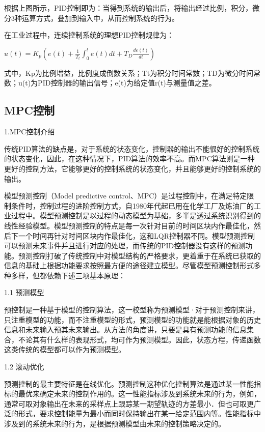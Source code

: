 根据上图所示，PID控制即为：当得到系统的输出后，将输出经过比例，积分，微分3种运算方式，叠加到输入中，从而控制系统的行为。

在工业过程中，连续控制系统的理想PID控制规律为：

$u(t)=K_{p}\left(e(t)+\frac{1}{T_{t}} \int_{0}^{t} e(t) d t+T_{D} \frac{d e(t)}{d t}\right)$

式中，Kp为比例增益，比例度成倒数关系；Tt为积分时间常数；TD为微分时间常数；u(t)为PID控制器的输出信号；e(t)为给定值r(t)与测量值之差。

\subsection{MPC控制}

1.MPC控制介绍

传统PID算法的缺点是，对于系统的状态变化，控制器的输出不能很好的控制系统的状态变化，因此，在这种情况下，PID算法的效率不高。而MPC算法则是一种更好的控制方法，它能够更好的控制系统的状态变化，并且能够更好的控制系统的输出。

模型预测控制（Model predictive control、MPC）是过程控制中，在满足特定限制条件时，控制过程的进阶控制方式，自1980年代起已用在化学工厂及炼油厂的工业过程中。模型预测控制是以过程的动态模型为基础，多半是透过系统识别得到的线性经验模型。模型预测控制的特点是每一次针对目前的时间区块内作最佳化，然后下一个时间再针对时间区块内作最佳化，这和LQR控制器不同。模型预测控制可以预测未来事件并且进行对应的处理，而传统的PID控制器没有这样的预测功能。预测控制打破了传统控制中对模型结构的严格要求，更着重于在系统已获取的信息的基础上根据功能要求按照最方便的途径建立模型。尽管模型预测控制形式多种多样，但都依赖下述三项基本原理：

1.1 预测模型

预控制是一种基于模型的控制算法，这一校型称为预测模型·对于预测控制来讲，只注重模型的功能，而不注重模型的形式，预测模型的功能就是能根据对象的历史信息和未来输入预其未来输出。从方法的角度讲，只要是具有预测功能的信息集合，不论其有什么样的表现形式，均可作为预测模型。因此，状态方程，传递函数这类传统的模型都可以作为预测模型。

1.2 滚动优化

预测控制的最主要特征是在线优化。预测控制这种优化控制算法是通过某一性能指标的最优来确定未来的控制作用的。这一性能指标涉及到系统未来的行为，例如，通常可取对象输出在未来的采样点上跟踪某一期望轨迹的方差最小．但也可取更广泛的形式，要求控制能量为最小而同时保持输出在某一给定范围内等。性能指标中涉及到的系统未来的行为，是根据预测模型由未来的控制策略决定的。

